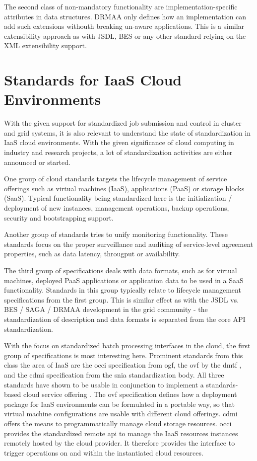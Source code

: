 \documentclass[twocolumn]{svjour3}       %
\begin{document}
The second class of non-mandatory functionality are implementation-specific attributes in data structures. DRMAA only defines how an implementation can add such extensions withouth breaking un-aware applications. This is a similar extensibility approach as with JSDL, BES or any other standard relying on the XML extensibility support. 


\section{Standards for IaaS Cloud Environments}
\label{sec:cloudstandards}

With the given support for standardized job submission and control in cluster and grid systems, it is also relevant to understand the state of standardization in IaaS cloud environments. With the given significance of cloud computing in industry and research projects, a lot of standardization activities are either announced or started. 

One group of cloud standards targets the lifecycle management of service offerings such as virtual machines (IaaS), applications (PaaS) or storage blocks (SaaS). Typical functionality being standardized here is the initialization / deployment of new instances, management operations, backup operations, security and bootstrapping support.

Another group of standards tries to unify monitoring functionality. These standards focus on the proper surveillance and auditing of service-level agreement properties, such as data latency, througput or availability.

The third group of specifications deals with data formats, such as for virtual machines, deployed PaaS applications or application data to be used in a SaaS functionality. Standards in this group typically relate to lifecycle management specifications from the first group. This is similar effect as with the JSDL vs. BES / SAGA / DRMAA development in the grid community - the standardization of description and data formats is separated from the core API standardization. 

With the focus on standardized batch processing interfaces in the cloud, the first group of specifications is most interesting here. Prominent standards from this class the area of IaaS are the \gls{occi} specification from \gls{ogf}, the \gls{ovf} by the \gls{dmtf} \cite{citemaster_9644}, and the \gls{cdmi} specification from the \gls{snia} standardization body. All three standards have shown to be usable in conjunction to implement a standards-based cloud service offering \cite{citemaster_9645}. The \gls{ovf} specification defines how a deployment package for IaaS environments can be formulated in a portable way, so that virtual machine configurations are usable with different cloud offerings. \gls{cdmi} offers the means to programmatically manage cloud storage resources. \gls{occi} provides the standardized remote \gls{api} to manage the IaaS resources instances remotely hosted by the cloud provider. It therefore provides the interface to trigger operations on and within the instantiated cloud resources. 
\end{document}
